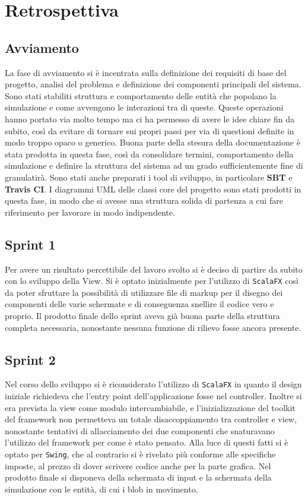 \section{Retrospettiva}

\subsection{Avviamento}
La fase di avviamento si è incentrata sulla definizione dei requisiti di base del progetto, analisi del problema e definizione dei componenti principali del sistema. Sono stati stabiliti struttura e comportamento delle entità che popolano la simulazione e come avvengono le interazioni tra di queste. Queste operazioni hanno portato via molto tempo ma ci ha permesso di avere le idee chiare fin da subito, così da evitare di tornare sui propri passi per via di questioni definite in modo troppo opaco o generico. Buona parte della stesura della documentazione è stata prodotta in questa fase, così da consolidare termini, comportamento della simulazione e definire la struttura del sistema ad un grado sufficientemente fine di granulatirà. Sono stati anche preparati i tool di sviluppo, in particolare \textbf{SBT} e \textbf{Travis CI}. I diagrammi UML delle classi core del progetto sono stati prodotti in questa fase, in modo che si avesse una struttura solida di partenza a cui fare riferimento per lavorare in modo indipendente.

\subsection{Sprint 1}
Per avere un risultato percettibile del lavoro svolto si è deciso di partire da subito con lo sviluppo della View. Si è optato inizialmente per l'utilizzo di \texttt{ScalaFX} così da poter sfruttare la possibilità di utilizzare file di markup per il disegno dei componenti delle varie schermate e di conseguenza snellire il codice vero e proprio. Il prodotto finale dello sprint aveva già buona parte della struttura completa necessaria, nonostante nessuna funzione di rilievo fosse ancora presente.

\subsection{Sprint 2}
Nel corso dello sviluppo si è riconsiderato l'utilizzo di \texttt{ScalaFX} in quanto il design iniziale richiedeva che l'entry point dell'applicazione fosse nel controller. Inoltre si era prevista la view come modulo intercambiabile, e l'inizializzazione del toolkit del framework non permetteva un totale disaccoppiamento tra controller e view, nonostante tentativi di allacciamento dei due componenti che snaturavano l'utilizzo del framework per come è stato pensato. Alla luce di questi fatti si è optato per \texttt{Swing}, che al contrario si è rivelato più conforme alle specifiche imposte, al prezzo di dover scrivere codice anche per la parte grafica. Nel prodotto finale si disponeva della schermata di input e la schermata della simulazione con le entità, di cui i blob in movimento.

